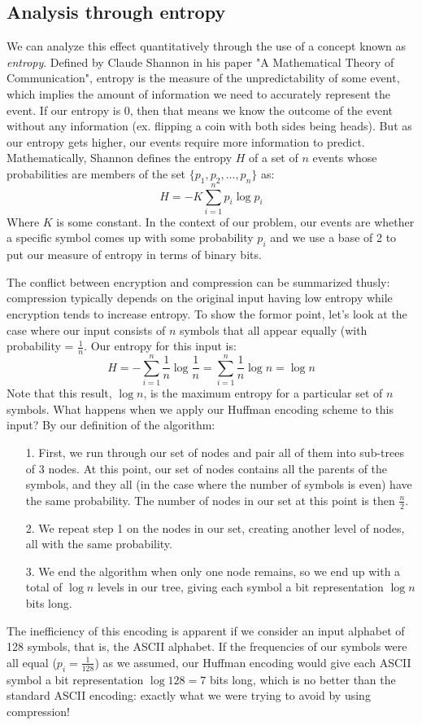 \documentclass[11pt]{article}
\begin{document}
\subsection{Analysis through entropy}\label{analysis-subsect}
We can analyze this effect quantitatively through the use of a concept known as \emph{entropy}.
Defined by Claude Shannon in his paper "A Mathematical Theory of Communication"\cite{shannon}, entropy is the measure of 
the unpredictability of some event, which implies the amount of information we need to accurately represent the event. 
If our entropy is 0, then that means we know the outcome of the event without any information (ex. flipping 
a coin with both sides being heads). But as our entropy gets higher, our events require more information to predict. 
Mathematically, Shannon defines the entropy $H$ of a set of $n$ events whose probabilities are members of 
the set $\{p_1,p_2,...,p_n\}$ as:
	$$H=-K\sum_{i=1}^{n}p_i\log{p_i}$$
Where $K$ is some constant. In the context of our problem, our events are whether a specific symbol comes up 
with some probability $p_i$ and we use a base of 2 to put our measure of entropy in terms of binary bits.

The conflict between encryption and compression can be summarized thusly: compression typically depends on 
the original input having low entropy while encryption tends to increase entropy. To show the formor point, let's
look at the case where our input consists of $n$ symbols that all appear equally (with probability = $\frac{1}{n}$. 
Our entropy for this input is:
	$$H=-\sum_{i=1}^{n}\frac{1}{n}\log{\frac{1}{n}}=\sum_{i=1}^{n}\frac{1}{n}\log{n}=\log{n}$$
Note that this result, $\log{n}$, is the maximum entropy for a particular set of $n$ symbols. What happens when we apply our 
Huffman encoding scheme to this input? By our definition of the algorithm:
\begin{itemize}
	\item[1.] First, we run through our set of nodes and pair all of them into sub-trees of 3 nodes. 
At this point, our set of nodes contains all the parents of the symbols, and they all (in the case where the number 
of symbols is even) have the same probability. The number of nodes in our set at this point is then $\frac{n}{2}$.
	\item[2.] We repeat step 1 on the nodes in our set, creating another level of nodes, all with the same probability.
	\item[3.] We end the algorithm when only one node remains, so we end up with a total of $\log n$ levels 
in our tree, giving each symbol a bit representation $\log n$ bits long. 
\end{itemize}
The inefficiency of this encoding is apparent if we consider an input alphabet of 128 symbols, that is, the ASCII alphabet. 
If the frequencies of our symbols were all equal ($p_i=\frac{1}{128}$) as we assumed, our Huffman encoding would give each 
ASCII symbol a bit representation $\log128 = 7$ bits long, which is no better than 
the standard ASCII encoding: exactly what we were trying to avoid by using compression!
\end{document}
